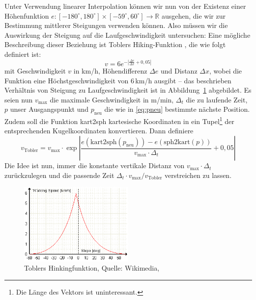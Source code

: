 \documentclass[
    paper=a4,
    DIV14,
    fontsize=12pt,
    pagesize=pdftex,
    toc=bibliographynumbered
]{scrartcl}
\numberwithin{figure}{section}
\numberwithin{equation}{section}
\numberwithin{table}{section}
\newcommand*\setR{\mathds{R}}
\begin{document}
Unter Verwendung linearer Interpolation können wir nun von der Existenz einer
Höhenfunktion $e : [-180^\circ, 180^\circ]\times[-59^\circ, 60^\circ] \to \setR$ ausgehen,
die wir zur Bestimmung mittlerer Steigungen verwenden können. Also müssen wir die
Auswirkung der Steigung auf die Laufgeschwindigkeit untersuchen: Eine mögliche
Beschreibung dieser Beziehung ist Toblers Hiking-Funktion \cite{wp:tobler}, die wie folgt
definiert ist:
\begin{equation*}
    v = 6e^{-\left| \frac{\Delta e}{\Delta x} + 0{,}05 \right|}
\end{equation*}
mit Geschwindigkeit $v$ in km/h, Höhendifferenz $\Delta e$ und Distanz $\Delta x$, wobei
die Funktion eine Höchstgeschwindigkeit von 6\,km/h ausgibt -- das beschrieben Verhältnis
von Steigung zu Laufgeschwindigkeit ist in Abbildung~\ref{fig:tobler} abgebildet. Es seien
nun $v_{\text{max}}$ die maximale Geschwindigkeit in m/min, $\Delta_t$ die zu laufende
Zeit, $p$ unser Ausgangspunkt und $p_{\text{neu}}$ die wie in \eqref{eq:pneu} bestimmte
nächste Position. Zudem soll die Funktion kart2sph kartesische Koordinaten in ein
Tupel\footnote{Die Länge des Vektors ist uninteressant.} der entsprechenden
Kugelkoordinaten konvertieren. Dann definiere
\begin{equation*}
    v_{\text{Tobler}} = v_{\text{max}} \cdot \exp\left|
    \frac{e(\mathrm{kart2sph}(p_\text{neu})) - e(\mathrm{sph2kart}(p))}{v_{\text{max}}
    \cdot \Delta_t} + 0{,}05 \right|
\end{equation*}
Die Idee ist nun, immer die konstante vertikale Distanz von $v_{\text{max}}\cdot\Delta_t$
zurückzulegen und die passende Zeit $\Delta_t \cdot v_{\text{max}} / v_{\text{Tobler}}$
verstreichen zu lassen.

\begin{figure}[htb]
    \centering
    \includegraphics[width=0.5\textwidth]{images/tobler.png}
    \caption{Toblers Hinkingfunktion, Quelle: Wikimedia, \cite{wp:tobler}}
    \label{fig:tobler}
\end{figure}
\end{document}
